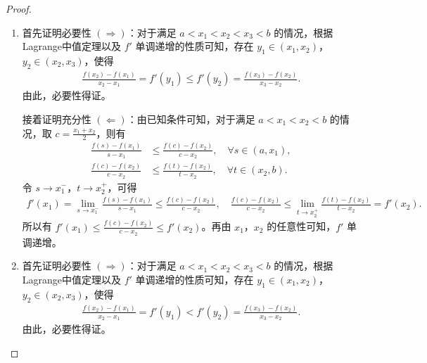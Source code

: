 \documentclass[lang=cn,newtx,10pt,scheme=chinese]{elegantbook}
\begin{document}
\begin{proof}
\begin{enumerate}[(1)]
\item 首先证明必要性 $(\Rightarrow)$：对于满足 $a < x_1 < x_2 < x_3 < b$ 的情况，根据Lagrange中值定理以及 $f'$ 单调递增的性质可知，存在 $y_1 \in (x_1, x_2)$，$y_2 \in (x_2, x_3)$，使得
\begin{align*}
\frac{f(x_2) - f(x_1)}{x_2 - x_1} = f'(y_1) \leqslant f'(y_2) = \frac{f(x_3) - f(x_2)}{x_3 - x_2}.
\end{align*}
由此，必要性得证。

接着证明充分性 $(\Leftarrow)$：由已知条件可知，对于满足 $a < x_1 < x_2 < b$ 的情况，取 $c = \frac{x_1 + x_2}{2}$，则有
\begin{align*}
\frac{f(s) - f(x_1)}{s - x_1} &\leqslant \frac{f(c) - f(x_2)}{c - x_2}, \quad \forall s \in (a, x_1), \\
\frac{f(c) - f(x_2)}{c - x_2} &\leqslant \frac{f(t) - f(x_2)}{t - x_2}, \quad \forall t \in (x_2, b).
\end{align*}
令 $s \to x_1^-$，$t \to x_2^+$，可得
\begin{align*}
f'(x_1) = \lim_{s \to x_1^-} \frac{f(s) - f(x_1)}{s - x_1} \leqslant \frac{f(c) - f(x_2)}{c - x_2}, \quad
\frac{f(c) - f(x_2)}{c - x_2} \leqslant \lim_{t \to x_2^+} \frac{f(t) - f(x_2)}{t - x_2} = f'(x_2).
\end{align*}
所以有 $f'(x_1) \leqslant \frac{f(c) - f(x_2)}{c - x_2} \leqslant f'(x_2)$。再由 $x_1$，$x_2$ 的任意性可知，$f'$ 单调递增。


\item 首先证明必要性 $(\Rightarrow)$：对于满足 $a < x_1 < x_2 < x_3 < b$ 的情况，根据Lagrange中值定理以及 $f'$ 单调递增的性质可知，存在 $y_1 \in (x_1, x_2)$，$y_2 \in (x_2, x_3)$，使得
\begin{align*}
\frac{f(x_2) - f(x_1)}{x_2 - x_1} = f'(y_1)<f'(y_2) = \frac{f(x_3) - f(x_2)}{x_3 - x_2}.
\end{align*}
由此，必要性得证。


\end{enumerate}
\end{proof}
\end{document}
